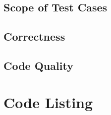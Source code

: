 \documentclass[12pt,a4paper]{article}
\begin{document}
\subsection{Scope of Test Cases}

\subsection{Correctness}

\subsection{Code Quality}


\appendix
\section{Code Listing}
\end{document}
